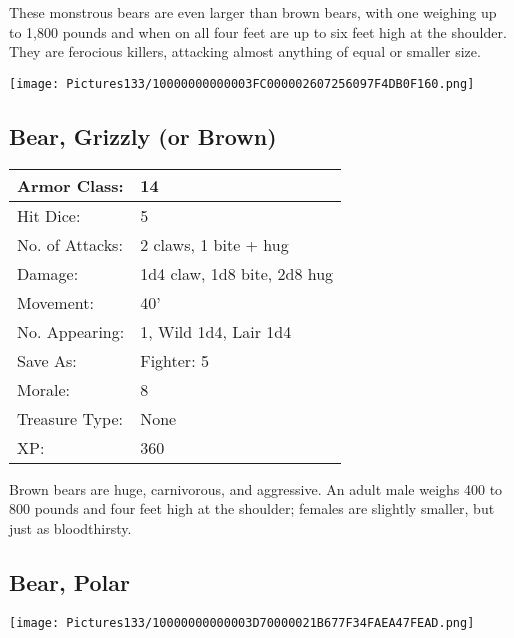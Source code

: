 \documentclass[a4paper,twoside,openany,10pt]{book}
\begin{document}
\begin{multicols}{2}
These monstrous bears are even larger than brown bears, with one weighing up to 1,800 pounds and when on all four feet are up to six feet high at the shoulder. They are ferocious killers, attacking almost anything of equal or smaller size.

\begin{center}
	\texttt{[image: Pictures133/10000000000003FC000002607256097F4DB0F160.png]}
\end{center}

\subsection*{Bear, Grizzly (or Brown)}\label{bear-grizzly-or-brown}

\begin{tabularx}{0.48\textwidth}{@{}lX@{}}
Armor Class: & 14 \\\hline
Hit Dice: & 5 \\\hline
No. of Attacks: & 2 claws, 1 bite + hug \\\hline
Damage: & 1d4 claw, 1d8 bite, 2d8 hug \\\hline
Movement: & 40' \\\hline
No. Appearing: & 1, Wild 1d4, Lair 1d4 \\\hline
Save As: & Fighter: 5 \\\hline
Morale: & 8 \\\hline
Treasure Type: & None \\\hline
XP: & 360 \\\hline
\end{tabularx}

Brown bears are huge, carnivorous, and aggressive. An adult male weighs 400 to 800 pounds and four feet high at the shoulder; females are slightly smaller, but just as bloodthirsty.

\subsection*{Bear, Polar}\label{bear-polar}


\begin{center}
	\texttt{[image: Pictures133/10000000000003D70000021B677F34FAEA47FEAD.png]}
\end{center}


\end{multicols}
\end{document}
